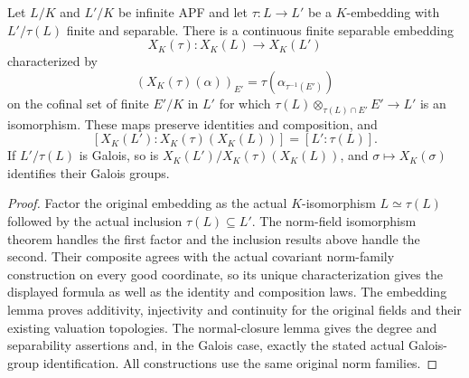 \begin{theorem}
\label{fw:finite-functor}
\leanok
Let $L/K$ and $L'/K$ be infinite APF and let
$\tau:L\longrightarrow L'$ be a $K$-embedding with $L'/\tau(L)$ finite
and separable. There is a continuous finite separable embedding
\[
 X_K(\tau):X_K(L)\longrightarrow X_K(L')
\]
characterized by
\[
 (X_K(\tau)(\alpha))_{E'}=\tau(\alpha_{\tau^{-1}(E')})
\]
on the cofinal set of finite $E'/K$ in $L'$ for which
$\tau(L)\otimes_{\tau(L)\cap E'}E'\longrightarrow L'$ is an isomorphism.
These maps preserve identities and composition, and
\[
 [X_K(L'):X_K(\tau)(X_K(L))]=[L':\tau(L)].
\]
If $L'/\tau(L)$ is Galois, so is
$X_K(L')/X_K(\tau)(X_K(L))$, and $\sigma\mapsto X_K(\sigma)$ identifies
their Galois groups.
\end{theorem}

\begin{proof}
Factor the original embedding as the actual $K$-isomorphism
$L\simeq\tau(L)$ followed by the actual inclusion $\tau(L)\subseteq L'$.
The norm-field isomorphism theorem handles the first factor and the
inclusion results above handle the second. Their composite agrees with
the actual covariant norm-family construction on every good coordinate,
so its unique characterization gives the displayed formula as well as
the identity and composition laws.
The embedding lemma proves additivity, injectivity and continuity
for the original fields and their existing valuation topologies.
The normal-closure lemma gives the degree and separability assertions
and, in the Galois case, exactly the stated actual Galois-group
identification. All constructions use the same original norm families.
\end{proof}

